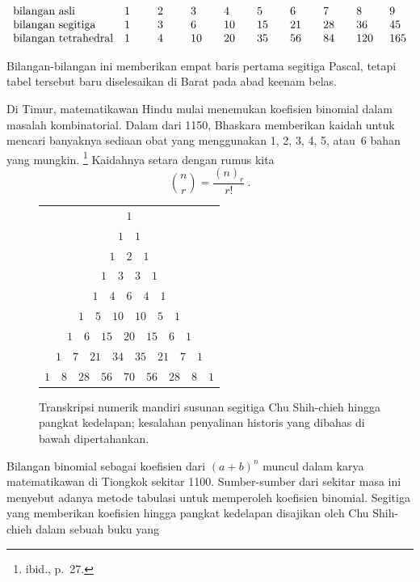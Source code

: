 \begin{table}
\centering
$$
\begin{array}{llllllllll} 
 \mbox {bilangan\ asli}       & 1\hskip.2in & 2\hskip.2in & 3\hskip.2in & 4\hskip.2in & 5\hskip.2in & 6\hskip.2in & 7\hskip.2in & 8\hskip.2in & 9  \cr
 \mbox {bilangan\ segitiga}   & 1     & 3     & 6    & 10   & 15   & 21   & 28   & 36  & 45 \cr
 \mbox {bilangan\ tetrahedral}& 1     & 4     & 10   & 20   & 35   & 56   & 84   & 120 &165  
\end{array}
$$
\caption{Bilangan figuratif.}
\label{table 3.9}
\end{table}
\par Bilangan-bilangan ini memberikan empat baris pertama segitiga Pascal, tetapi tabel
tersebut baru diselesaikan di Barat pada abad keenam belas.
\par
Di Timur, matematikawan Hindu mulai menemukan koefisien binomial dalam masalah
kombinatorial.  Dalam  dari 1150, Bhaskara memberikan kaidah untuk mencari
banyaknya sediaan obat yang menggunakan 1, 2, 3, 4, 5, atau~6 bahan yang mungkin.
\footnote{ibid., p.~27.}  Kaidahnya setara dengan rumus kita
$$ {n \choose r} = \frac{(n)_r}{r!}\ .
$$
\begin{figure}[ht]
\centering
\small
\begin{tabular}{c}
$1$\\
$1\quad 1$\\
$1\quad 2\quad 1$\\
$1\quad 3\quad 3\quad 1$\\
$1\quad 4\quad 6\quad 4\quad 1$\\
$1\quad 5\quad 10\quad 10\quad 5\quad 1$\\
$1\quad 6\quad 15\quad 20\quad 15\quad 6\quad 1$\\
$1\quad 7\quad 21\quad 34\quad 35\quad 21\quad 7\quad 1$\\
$1\quad 8\quad 28\quad 56\quad 70\quad 56\quad 28\quad 8\quad 1$
\end{tabular}
\caption{Transkripsi numerik mandiri susunan segitiga Chu Shih-chieh hingga
pangkat kedelapan; kesalahan penyalinan historis yang dibahas di bawah
dipertahankan.}
\label{fig 3.12}
\end{figure}
\par
Bilangan binomial sebagai koefisien dari $(a + b)^n$ muncul dalam karya matematikawan
di Tiongkok sekitar 1100.  Sumber-sumber dari sekitar masa ini menyebut adanya metode
tabulasi untuk memperoleh koefisien binomial.  Segitiga yang memberikan koefisien hingga
pangkat kedelapan disajikan oleh Chu Shih-chieh dalam sebuah buku yang
